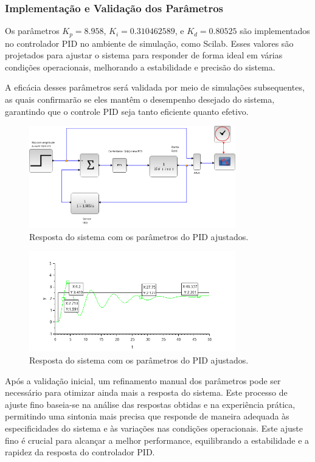 \subsubsection{Implementação e Validação dos Parâmetros}
Os parâmetros \( K_p = 8.958 \), \( K_i = 0.310462589 \), e \( K_d = 0.80525 \) são implementados no controlador PID no ambiente de simulação, como Scilab. Esses valores são projetados para ajustar o sistema para responder de forma ideal em várias condições operacionais, melhorando a estabilidade e precisão do sistema.

A eficácia desses parâmetros será validada por meio de simulações subsequentes, as quais confirmarão se eles mantêm o desempenho desejado do sistema, garantindo que o controle PID seja tanto eficiente quanto efetivo.

\begin{figure}[H]
    \centering
    \includegraphics[width=0.8\textwidth]{6-atividade/assets/a/diagrama-pid.png}
    \caption{Resposta do sistema com os parâmetros do PID ajustados.}
    \label{fig:diagrama-pid}
\end{figure}

\begin{figure}[H]
    \centering
    \includegraphics[width=0.8\textwidth]{6-atividade/assets/a/pid.png}
    \caption{Resposta do sistema com os parâmetros do PID ajustados.}
    \label{fig:resposta-pid}
\end{figure}

Após a validação inicial, um refinamento manual dos parâmetros pode ser necessário para otimizar ainda mais a resposta do sistema. Este processo de ajuste fino baseia-se na análise das respostas obtidas e na experiência prática, permitindo uma sintonia mais precisa que responde de maneira adequada às especificidades do sistema e às variações nas condições operacionais. Este ajuste fino é crucial para alcançar a melhor performance, equilibrando a estabilidade e a rapidez da resposta do controlador PID.

